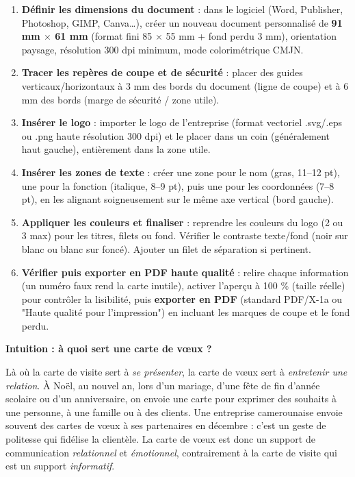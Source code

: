 \documentclass[11pt]{article}
\newcounter{popsec}
\newcounter{popsub}
\newcommand{\courssub}[1]{%
  \stepcounter{popsub}%
  \par\vspace{9pt}\noindent{\popxbold\fontsize{11.5}{13}\selectfont\color{popink}{\color{poporange}\thepopsec.\thepopsub}\hspace{6pt}#1}\par\nopagebreak\vspace{4pt}
}
\begin{document}
\begin{methode}
\begin{enumerate}
\item \textbf{Définir les dimensions du document} : dans le logiciel (Word, Publisher, Photoshop, GIMP, Canva\ldots), créer un nouveau document personnalisé de \textbf{91 mm $\times$ 61 mm} (format fini 85 $\times$ 55 mm + fond perdu 3 mm), orientation paysage, résolution 300 dpi minimum, mode colorimétrique CMJN.
\item \textbf{Tracer les repères de coupe et de sécurité} : placer des guides verticaux/horizontaux à 3 mm des bords du document (ligne de coupe) et à 6 mm des bords (marge de sécurité / zone utile).
\item \textbf{Insérer le logo} : importer le logo de l'entreprise (format vectoriel .svg/.eps ou .png haute résolution 300 dpi) et le placer dans un coin (généralement haut gauche), entièrement dans la zone utile.
\item \textbf{Insérer les zones de texte} : créer une zone pour le nom (gras, 11--12 pt), une pour la fonction (italique, 8--9 pt), puis une pour les coordonnées (7--8 pt), en les alignant soigneusement sur le même axe vertical (bord gauche).
\item \textbf{Appliquer les couleurs et finaliser} : reprendre les couleurs du logo (2 ou 3 max) pour les titres, filets ou fond. Vérifier le contraste texte/fond (noir sur blanc ou blanc sur foncé). Ajouter un filet de séparation si pertinent.
\item \textbf{Vérifier puis exporter en PDF haute qualité} : relire chaque information (un numéro faux rend la carte inutile), activer l'aperçu à 100 \% (taille réelle) pour contrôler la lisibilité, puis \textbf{exporter en PDF} (standard PDF/X-1a ou "Haute qualité pour l'impression") en incluant les marques de coupe et le fond perdu.
\end{enumerate}
\end{methode}

\courssub{La carte de vœux}

\textbf{Intuition : à quoi sert une carte de vœux ?}

Là où la carte de visite sert à \emph{se présenter}, la carte de vœux sert à \emph{entretenir une relation}. À Noël, au nouvel an, lors d'un mariage, d'une fête de fin d'année scolaire ou d'un anniversaire, on envoie une carte pour exprimer des souhaits à une personne, à une famille ou à des clients. Une entreprise camerounaise envoie souvent des cartes de vœux à ses partenaires en décembre : c'est un geste de politesse qui fidélise la clientèle. La carte de vœux est donc un support de communication \emph{relationnel} et \emph{émotionnel}, contrairement à la carte de visite qui est un support \emph{informatif}.
\end{document}
